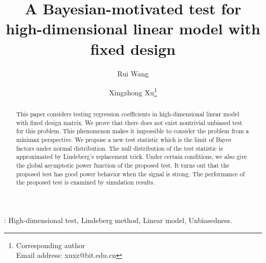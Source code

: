 \documentclass[11pt]{article}
\theoremstyle{plain}
\theoremstyle{definition}
\theoremstyle{remark}
\begin{document}
\title{
A Bayesian-motivated test for high-dimensional linear model with fixed design
}



\author[1]{Rui Wang}
\author[1,2]{Xingzhong Xu\thanks{Corresponding author\\Email address: xuxz@bit.edu.cn}}

\maketitle
\begin{abstract}
    This paper considers testing regression coefficients in high-dimensional linear model with fixed design matrix.
    We prove that there does not exist nontrivial unbiased test for this problem.
    This phenomenon makes it impossible to consider the problem from a minimax perspective.
    We propose a new test statistic which is the limit of Bayes factors under normal distribution.
    The null distribution of the test statistic is approximated by Lindeberg's replacement trick.
    Under certain conditions, we also give the global asymptotic power function of the proposed test.
    It turns out that the proposed test has good power behavior when the signal is strong.
    The performance of the proposed test is examined by simulation results.

\end{abstract}

: High-dimensional test, Lindeberg method, Linear model, Unbiasedness.
\end{document}
